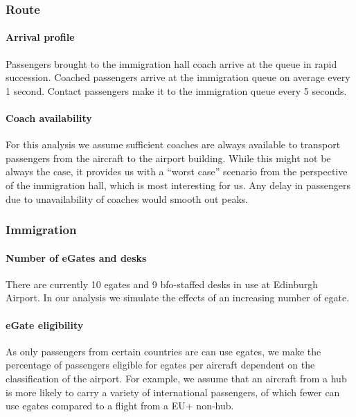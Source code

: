\documentclass[10pt]{article}
\begin{document}
\subsubsection{Route}

\paragraph{Arrival profile} 
 Passengers  brought to the immigration hall coach arrive at the queue in rapid succession. Coached passengers arrive at the immigration queue on average every 1 second. Contact passengers make it to the immigration queue every 5 seconds.

\paragraph{Coach availability}
For this analysis we assume sufficient coaches are always available to transport passengers from the aircraft to the airport building. While this might not be always the case, it provides us with a ``worst case'' scenario from the perspective of the immigration hall, which is most interesting for us. Any delay in passengers due to unavailability of coaches would smooth out peaks.

\subsubsection{Immigration} \label{subsec:choices_immigration}

\paragraph{Number of eGates and desks} There are currently 10 \glspl{egate} and 9 \gls{bfo}-staffed desks in use at Edinburgh Airport. In our analysis we simulate the effects of an increasing number of \gls{egate}.



\paragraph{eGate eligibility}
As only passengers from certain countries are can use \glspl{egate}, we make the percentage of passengers eligible for \glspl{egate} per aircraft dependent on the classification of the airport. For example, we assume that an aircraft from a hub is more likely to carry a variety of international passengers, of which fewer can use \glspl{egate} compared to a flight from a EU+ non-hub. 
\end{document}
